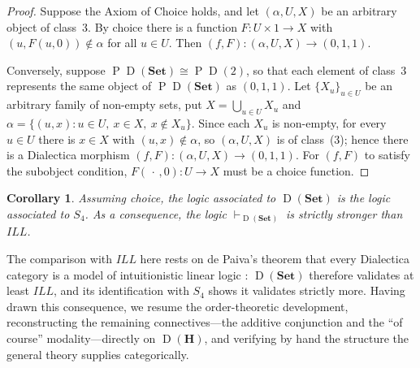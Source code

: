 \documentclass[reqno]{amsart}
\theoremstyle{plain}
\newtheorem{cor}[thm]{Corollary}
\theoremstyle{definition}
\newcommand{\Set}{\mathbf{Set}}
\DeclareMathOperator{\D}{D}
\newcommand{\cf}[1]{\mathbf{#1}}
\DeclareMathOperator{\PR}{P}
\begin{document}
\begin{proof}
    Suppose the Axiom of Choice holds, and let $ (\alpha, U, X) $ be an arbitrary object of class~3. By choice there is a function $ F \colon U \times 1 \to X $ with $ (u, F(u,0)) \notin \alpha $ for all $ u \in U $. Then $ (f, F) \colon (\alpha, U, X) \to (0,1,1) $.

    Conversely, suppose $ \PR\D(\Set) \cong \PR\D(2) $, so that each element of class~3 represents the same object of $ \PR\D(\Set) $ as $ (0,1,1) $. Let $ \{ X_u \}_{u \in U} $ be an arbitrary family of non-empty sets, put $ X = \bigcup_{u \in U} X_u $ and $ \alpha = \{ (u, x) : u \in U,\ x \in X,\ x \notin X_u \} $. Since each $ X_u $ is non-empty, for every $ u \in U $ there is $ x \in X $ with $ (u, x) \notin \alpha $, so $ (\alpha, U, X) $ is of class~(3); hence there is a Dialectica morphism $ (f, F) \colon (\alpha, U, X) \to (0,1,1) $. For $ (f,F) $ to satisfy the subobject condition, $ F(\,\cdot\,, 0) \colon U \to X $ must be a choice function.
\end{proof}
\begin{cor}
    Assuming choice, the logic associated to $\D(\Set) $ is the logic associated to $S_4$. As a consequence, the logic $\vdash_{\D(\Set)}$ is strictly stronger than $ILL$.
\end{cor}

The comparison with $ILL$ here rests on de Paiva's theorem that every Dialectica category is a model of intuitionistic linear logic \cite{dePaiva1991}: $\D(\Set)$ therefore validates at least $ILL$, and its identification with $S_4$ shows it validates strictly more. Having drawn this consequence, we resume the order-theoretic development, reconstructing the remaining connectives---the additive conjunction and the ``of course'' modality---directly on $\D(\cf{H})$, and verifying by hand the structure the general theory supplies categorically.
\end{document}
